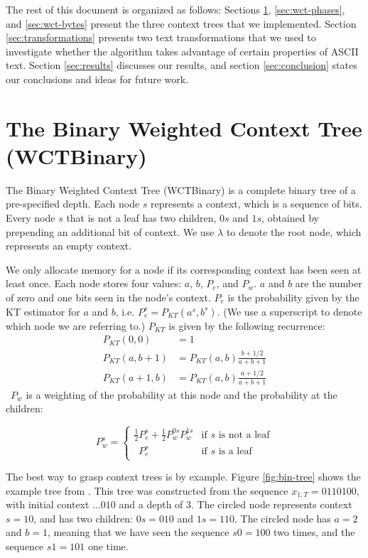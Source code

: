 \documentclass[11pt]{scrartcl}
\begin{document}
The rest of this document is organized as follows: Sections
\ref{sec:wct-binary}, \ref{sec:wct-phases}, and \ref{sec:wct-bytes} present the
three context trees that we implemented. Section \ref{sec:transformations}
presents two text transformations that we used to investigate whether the
algorithm takes advantage of certain properties of ASCII text. Section
\ref{sec:results} discusses our results, and section \ref{sec:conclusion}
states our conclusions and ideas for future work.


\section{The Binary Weighted Context Tree (WCTBinary)}
\label{sec:wct-binary}

The Binary Weighted Context Tree (WCTBinary) is a complete binary tree of a
pre-specified depth. Each node $s$ represents a context, which is a sequence of
bits. Every node $s$ that is not a leaf has two children, $0s$ and $1s$,
obtained by prepending an additional bit of context.  We use $\lambda$ to
denote the root node, which represents an empty context.

We only allocate memory for a node if its corresponding context has been seen
at least once. Each node stores four values: $a$, $b$, $P_e$, and $P_w$. $a$
and $b$ are the number of zero and one bits seen in the node's context. $P_e$
is the probability given by the KT estimator for $a$ and $b$, i.e. $P_e^s =
P_{KT}(a^s, b^s)$. (We use a superscript to denote which node we are referring
to.) $P_{KT}$ is given by the following recurrence:
\
\begin{align*}
P_{KT}(0, 0)   &= 1 \\
P_{KT}(a, b+1) &= P_{KT}(a, b) \frac{b + 1/2}{a + b + 1} \\
P_{KT}(a+1, b) &= P_{KT}(a, b) \frac{a + 1/2}{a + b + 1}
\end{align*}
\
$P_w$ is a weighting of the probability at this node and the probability at the
children:

\[
P_w^s =
\left\{
\begin{array}{ll}
\frac{1}{2} P_e^s + \frac{1}{2} P_w^{0s} P_w^{1s}
    & \mbox{if $s$ is not a leaf} \\
\phantom{\frac{1}{2}} P_e^s
    & \mbox{if $s$ is a leaf}
\end{array}
\right.
\]

The best way to grasp context trees is by example. Figure \ref{fig:bin-tree}
shows the example tree from \textcite{eidma}. This tree was constructed from
the sequence $x_{1:T} = 0110100$, with initial context $...010$ and a depth of
3.  The circled node represents context $s = 10$, and has two children: $0s =
010$ and $1s = 110$. The circled node has $a = 2$ and $b = 1$, meaning that we
have seen the sequence $s0 = 100$ two times, and the sequence $s1 = 101$ one
time.
\end{document}
